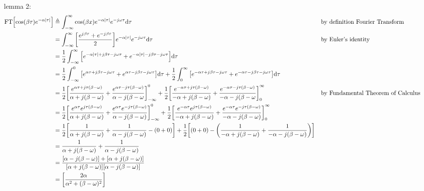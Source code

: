 lemma 2:
\begin{align*}
  \mathrm{FT}{\left[\cos(\beta\tau)e^{-\alpha{\left\lvert \tau \right\rvert}}\right]}
    &\triangleq \int_{-\infty}^{\infty} \cos(\beta x)e^{-\alpha{\left\lvert \tau \right\rvert}} e^{-j\omega\tau}\mathrm{d\tau}
    && \text{by definition Fourier Transform}
  \\&= \int_{-\infty}^{\infty} {\left[\frac{e^{j\beta\tau}+e^{-j\beta\tau}}{2}\right]} e^{-\alpha{\left\lvert \tau \right\rvert}} e^{-j\omega\tau}\mathrm{d\tau}
    &&  \text{by Euler's identity}
  \\&= \frac{1}{2}\int_{-\infty}^{\infty} {\left[e^{-\alpha{\left\lvert \tau \right\rvert}+j\beta\tau-j\omega\tau}+e^{-\alpha{\left\lvert \tau \right\rvert}-j\beta\tau-j\omega\tau}\right]} \mathrm{d\tau}
  \\&= \frac{1}{2}\int_{-\infty}^{0} {\left[e^{ \alpha\tau +j\beta\tau-j\omega\tau}+e^{ \alpha\tau -j\beta\tau-j\omega\tau}\right]} \mathrm{d\tau}
     + \frac{1}{2}\int_{0}^{\infty}  {\left[e^{-\alpha\tau +j\beta\tau-j\omega\tau}+e^{-\alpha\tau -j\beta\tau-j\omega\tau}\right]} \mathrm{d\tau}
  \\&= \frac{1}{2} {\left[\frac{e^{ \alpha\tau +j\tau(\beta-\omega)}}{ \alpha +j(\beta-\omega)} + \frac{e^{ \alpha\tau -j\tau(\beta-\omega)}}{ \alpha -j(\beta-\omega}\right]}_{-\infty}^{0}
     + \frac{1}{2} {\left[\frac{e^{-\alpha\tau +j\tau(\beta-\omega)}}{-\alpha +j(\beta-\omega)} + \frac{e^{-\alpha\tau -j\tau(\beta-\omega)}}{-\alpha -j(\beta-\omega}\right]}_{0}^{\infty} 
    && \text{by Fundamental Theorem of Calculus}
  \\&= \frac{1}{2} {\left[\frac{e^{ \alpha\tau} e^{j\tau(\beta-\omega)}}{ \alpha +j(\beta-\omega)} + \frac{e^{ \alpha\tau} e^{-j\tau(\beta-\omega)}}{ \alpha -j(\beta-\omega)}\right]}_{-\infty}^{0}
     + \frac{1}{2} {\left[\frac{e^{-\alpha\tau} e^{j\tau(\beta-\omega)}}{-\alpha +j(\beta-\omega)} + \frac{e^{-\alpha\tau} e^{-j\tau(\beta-\omega)}}{-\alpha -j(\beta-\omega)}\right]}_{0}^{\infty} 
  \\&= \frac{1}{2} {\left[\frac{1}{ \alpha +j(\beta-\omega)} + \frac{1}{ \alpha -j(\beta-\omega)} - (0+0)\right]}
     + \frac{1}{2} {\left[(0+0)-{\left(\frac{1}{-\alpha +j(\beta-\omega)} + \frac{1}{-\alpha -j(\beta-\omega)}\right)}\right]}
  \\&= \frac{1}{ \alpha +j(\beta-\omega)} + \frac{1}{ \alpha -j(\beta-\omega)}
  \\&= \frac{{\left[\alpha -j(\beta-\omega)\right]} + {\left[\alpha +j(\beta-\omega)\right]}}
            {{\left[\alpha +j(\beta-\omega)\right]}{\left[\alpha -j(\beta-\omega)\right]}}
  \\&= {\left[\frac{2\alpha}{\alpha^2+(\beta-\omega)^2}\right]}
\end{align*}
